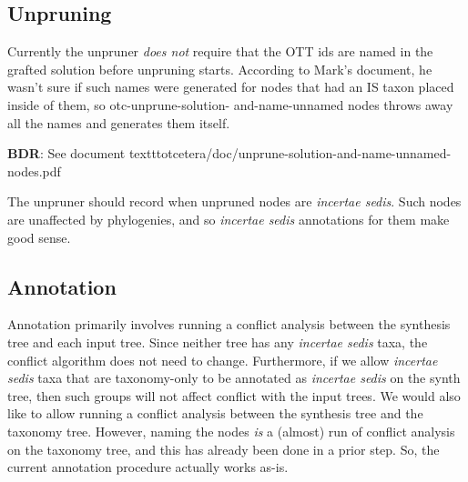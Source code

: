 \documentclass[english]{article}
\begin{document}
\subsection{Unpruning}

Currently the unpruner \emph{does not} require that the OTT ids are
named in the grafted solution before unpruning starts. According to
Mark's document, he wasn't sure if such names were generated for nodes
that had an IS taxon placed inside of them, so otc-unprune-solution-
and-name-unnamed nodes throws away all the names and generates them
itself.

\textbf{BDR}: See document texttt{otcetera/doc/unprune-solution-and-name-unnamed-nodes.pdf}

The unpruner should record when unpruned nodes are \emph{incertae
sedis}. Such nodes are unaffected by phylogenies, and so
\emph{incertae sedis} annotations for them make good sense.

\subsection{Annotation}

Annotation primarily involves running a conflict analysis between the
synthesis tree and each input tree. Since neither tree has any
\emph{incertae sedis} taxa, the conflict algorithm does not need to
change. Furthermore, if we allow \emph{incertae sedis} taxa that are
taxonomy-only to be annotated as \emph{incertae sedis} on the synth
tree, then such groups will not affect conflict with the input trees.
We would also like to allow running a conflict analysis between the
synthesis tree and the taxonomy tree. However, naming the nodes
\emph{is} a (almost) run of conflict analysis on the taxonomy tree,
and this has already been done in a prior step. So, the current
annotation procedure actually works as-is.
\end{document}
